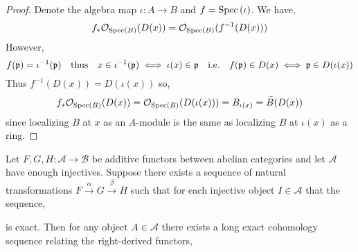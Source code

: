\documentclass[12pt]{article}
\begin{document}
\begin{proof}
Denote the algebra map $\iota : A \to B$ and $f = \mathrm{Spec}\left( \iota \right)$. We have, 
\[ f_* \mathcal{O}_{\mathrm{Spec}\left( B \right)}(D(x)) = \mathcal{O}_{\mathrm{Spec}\left( B \right)}(f^{-1}(D(x))) \] However, 
\[ f(\mathfrak{p}) = \iota^{-1}(\mathfrak{p}) \quad \text{thus} \quad x \in \iota^{-1}(\mathfrak{p}) \iff \iota(x) \in \mathfrak{p} \quad \text{i.e.} \quad f(\mathfrak{p}) \in D(x) \iff \mathfrak{p} \in D(\iota(x)) \] Thus $f^{-1}(D(x)) = D(\iota(x))$ so,
\[ f_* \mathcal{O}_{\mathrm{Spec}\left( B \right)}(D(x)) = \mathcal{O}_{\mathrm{Spec}\left( B \right)}(D(\iota(x))) = B_{\iota(x)}  = \widetilde{B}(D(x)) \]
since localizing $B$ at $x$ as an $A$-module is the same as localizing $B$ at $\iota(x)$ as a ring.
\end{proof}

\begin{lemma} \label{lem:exact_seq_of_functors}
Let $F, G, H : \mathcal{A} \to \mathcal{B}$ be additive functors between abelian categories and let $\mathcal{A}$ have enough injectives. Suppose there exists a sequence of natural transformations $F \xrightarrow{\alpha} G \xrightarrow{\beta} H$ such that for each injective object $I \in \mathcal{A}$ that the sequence,
\begin{center}
\end{center}
is exact. Then for any object $A \in \mathcal{A}$ there exists a long exact cohomology sequence relating the right-derived functors,
\begin{center}
\end{center}
\end{lemma}
\end{document}
